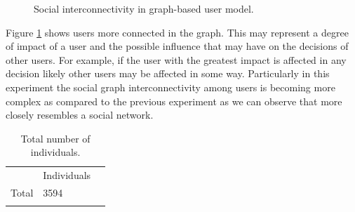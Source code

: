 \begin{figure}
\centering
{} %
\caption{Social interconnectivity in graph-based user model.}
\label{fig:graphKnown_3}
\end{figure}

Figure \ref{fig:graphKnown_3} shows users more connected in the graph. This
may represent a degree of impact of a user and the possible influence that may
have on the decisions of other users. For example, if the user with the greatest
impact is affected in any decision likely other users may be affected in some
way. Particularly in this experiment the social graph interconnectivity among
users is becoming more complex as compared to the previous experiment as we can
observe that more closely resembles a social network.


\begin{table}
\small
\caption{Total number of individuals.}
\label{tab:totalIndividuals_33}
\centering
\small
\begin{tabular}{p{3cm} p{3cm} p{3cm} }
\hline\noalign{\smallskip}
  & Individuals &  \\
\noalign{\smallskip}\hline\noalign{\smallskip}
\small{Total } & \small{3594} & \\ \hline
\noalign{\smallskip}\hline
\end{tabular}
\end{table}

